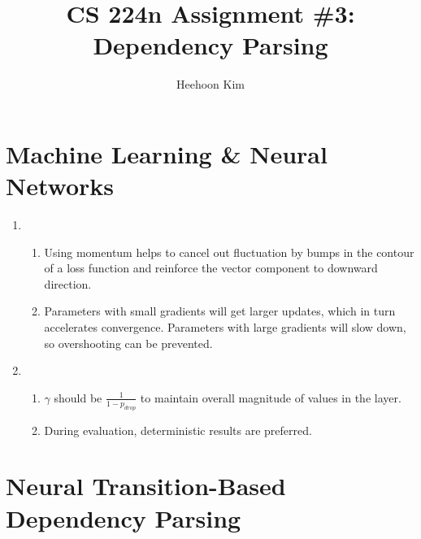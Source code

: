 \documentclass{article}
\title{CS 224n Assignment \#3: Dependency Parsing}
\author{Heehoon Kim}
\date{}
\begin{document}
\maketitle

\section{Machine Learning \& Neural Networks}

\begin{enumerate}[label=(\alph*)]
\item
\begin{enumerate}[label=\roman*.]
\item Using momentum helps to cancel out fluctuation by bumps in the contour of a loss function and reinforce the vector component to downward direction.
\item Parameters with small gradients will get larger updates, which in turn accelerates convergence. Parameters with large gradients will slow down, so overshooting can be prevented.
\end{enumerate}
\item
\begin{enumerate}[label=\roman*.]
\item $\gamma$ should be $\frac{1}{1-p_{drop}}$ to maintain overall magnitude of values in the layer.
\item During evaluation, deterministic results are preferred.
\end{enumerate}
\end{enumerate}

\section{Neural Transition-Based Dependency Parsing}
\end{document}

